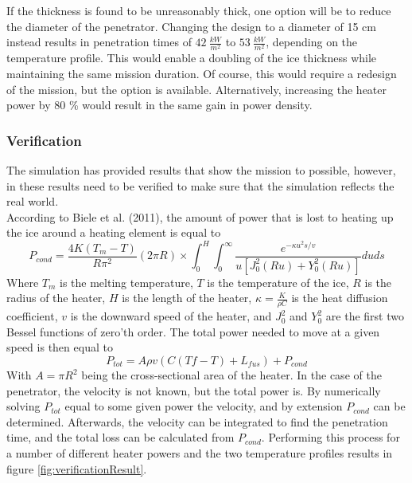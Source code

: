 \noindent
If the thickness is found to be unreasonably thick, one option will be to reduce the diameter of the penetrator. Changing the design to a diameter of 15 cm instead results in penetration times of $\SI{42}{\frac{kW}{m^2}}$ to $\SI{53}{\frac{kW}{m^2}}$, depending on the temperature profile. This would enable a doubling of the ice thickness while maintaining the same mission duration. Of course, this would require a redesign of the mission, but the option is available. Alternatively, increasing the heater power by 80 \% would result in the same gain in power density. 

\subsubsection{Verification}
The simulation has provided results that show the mission to possible, however, in these results need to be verified to make sure that the simulation reflects the real world.\\

\noindent
According to Biele et al. (2011)\cite{article:biele2011a}, the amount of power that is lost to heating up the ice around a heating element is equal to
\begin{equation}
P_{cond}=\frac{4 K (T_m-T) }{R\pi^2}(2\pi R)\times \int_{0}^{H}\int_{0}^{\infty}\frac{
e^{-\kappa u^2 s/v}
}{
u\left[J_0^2(R u) + Y_0^2(R u)\right]
}duds
\end{equation}
Where $T_m$ is the melting temperature, $T$ is the temperature of the ice, $R$ is the radius of the heater, $H$ is the length of the heater, $\kappa=\frac{K}{\rho C}$ is the heat diffusion coefficient, $v$ is the downward speed of the heater, and $J_0^2$ and $Y_0^2$ are the first two Bessel functions of zero'th order. The total power needed to move at a given speed is then equal to
\begin{equation}
P_{tot} = A\rho v(C(Tf-T) + L_{fus}) + P_{cond}
\end{equation} 
With $A=\pi R^2$ being the cross-sectional area of the heater. In the case of the penetrator, the velocity is not known, but the total power is. By numerically solving $P_{tot}$ equal to some given power the velocity, and by extension $P_{cond}$ can be determined. Afterwards, the velocity can be integrated to find the penetration time, and the total loss can be calculated from $P_{cond}$. Performing this process for a number of different heater powers and the two temperature profiles results in figure \ref{fig:verificationResult}.


